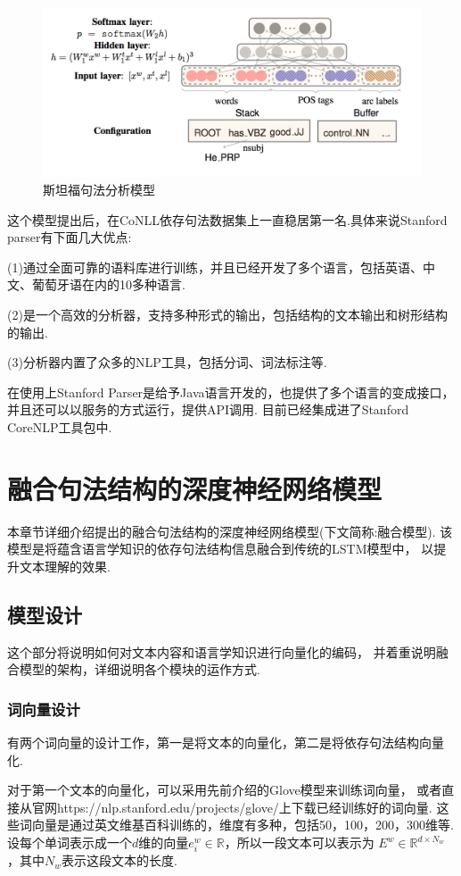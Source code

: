 \documentclass[bachelor,adobefonts]{jnuthesis}
\begin{document}
\begin{figure}[h!]
  \centering
  \includegraphics[width=0.85\linewidth]{sitanfujufafenximoxing.png}
  \caption{斯坦福句法分析模型}
\end{figure}

这个模型提出后，在CoNLL依存句法数据集上一直稳居第一名.具体来说Stanford parser有下面几大优点:

(1)通过全面可靠的语料库进行训练，并且已经开发了多个语言，包括英语、中文、葡萄牙语在内的10多种语言.

(2)是一个高效的分析器，支持多种形式的输出，包括结构的文本输出和树形结构的输出.

(3)分析器内置了众多的NLP工具，包括分词、词法标注等.

在使用上Stanford Parser是给予Java语言开发的，也提供了多个语言的变成接口，
并且还可以以服务的方式运行，提供API调用.
目前已经集成进了Stanford CoreNLP工具包中.



\chapter{融合句法结构的深度神经网络模型}
本章节详细介绍提出的融合句法结构的深度神经网络模型(下文简称:融合模型).
该模型是将蕴含语言学知识的依存句法结构信息融合到传统的LSTM模型中，
以提升文本理解的效果.
\section{模型设计}
这个部分将说明如何对文本内容和语言学知识进行向量化的编码，
并着重说明融合模型的架构，详细说明各个模块的运作方式.
\subsection{词向量设计}
有两个词向量的设计工作，第一是将文本的向量化，第二是将依存句法结构向量化.

对于第一个文本的向量化，可以采用先前介绍的Glove模型来训练词向量，
或者直接从官网https://nlp.stanford.edu/projects/glove/上下载已经训练好的词向量.
这些词向量是通过英文维基百科训练的，维度有多种，包括50，100，200，300维等.
设每个单词表示成一个$d$维的向量$e_{i}^{w} \in \mathbb{R}$，所以一段文本可以表示为
$E^{w} \in \mathbb{R}^{d \times N_{w}}$，其中$N_{w}$表示这段文本的长度.
\end{document}
